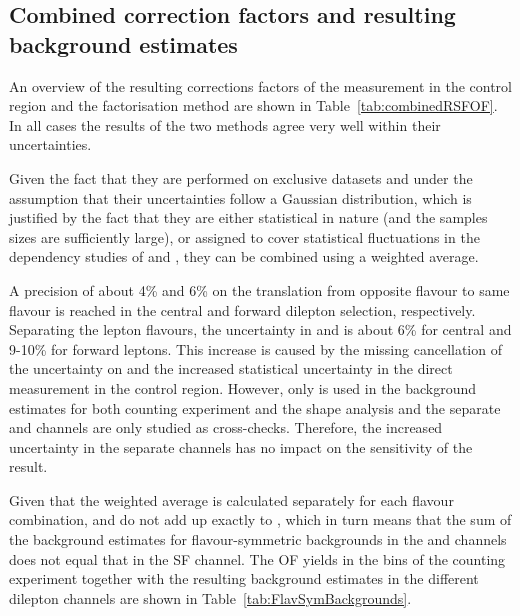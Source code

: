 \subsection{Combined correction factors and resulting background estimates}
\label{sec:combinedRSFOF}
An overview of the resulting corrections factors of the measurement in the control region and the factorisation method are shown in Table~\ref{tab:combinedRSFOF}. In all cases the results of the two methods agree very well within their uncertainties. 

Given the fact that they are performed on exclusive datasets and under the assumption that their uncertainties follow a Gaussian distribution, which is justified by the fact that they are either statistical in nature (and the samples sizes are sufficiently large), or assigned to cover statistical fluctuations in the dependency studies of \rmue and \RT, they can be combined using a weighted average. 
 
A precision of about 4\% and 6\% on the translation from opposite flavour to same flavour is reached in the central and forward dilepton selection, respectively. Separating the lepton flavours, the uncertainty in \Reeof and \Rmmof is about 6\% for central and 9-10\% for forward leptons. This increase is caused by the missing cancellation of the uncertainty on \rmue and the increased statistical uncertainty in the direct measurement in the control region. However, only \Rsfof is used in the background estimates for both counting experiment and the shape analysis and the separate \EE and \MM channels are only studied as cross-checks. Therefore, the increased uncertainty in the separate channels has no impact on the sensitivity of the result.

Given that the weighted average is calculated separately for each flavour combination, \Reeof and \Rmmof do not add up exactly to \Rsfof, which in turn means that the sum of the background estimates for flavour-symmetric backgrounds in the \EE and \MM channels does not equal that in the SF channel. The OF yields in the \mll bins of the counting experiment together with the resulting background estimates in the different dilepton channels are shown in Table~\ref{tab:FlavSymBackgrounds}. 





